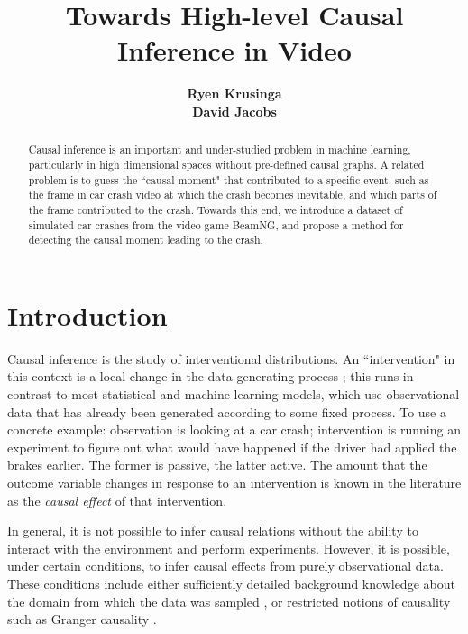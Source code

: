 \documentclass[letterpaper]{article} %
\title{Towards High-level Causal Inference in Video}
\author{
\Large \textbf{Ryen Krusinga} \\
\Large \textbf{David Jacobs}
}
\begin{document}
\maketitle

\begin{abstract}
Causal inference is an important and under-studied problem in machine learning, particularly in high dimensional spaces without pre-defined causal graphs. A related problem is to guess the ``causal moment" that contributed to a specific event, such as the frame in car crash video at which the crash becomes inevitable, and which parts of the frame contributed to the crash. Towards this end, we introduce a dataset of simulated car crashes from the video game BeamNG, and propose a method for detecting the causal moment leading to the crash.
\end{abstract}

\section{Introduction}
\noindent Causal inference is the study of interventional distributions. An ``intervention" in this context is a local change in the data generating process \cite{pearl2009causal}; this runs in contrast to most statistical and machine learning models, which use observational data that has already been generated according to some fixed process. To use a concrete example: observation is looking at a car crash; intervention is running an experiment to figure out what would have happened if the driver had applied the brakes earlier. The former is passive, the latter active. The amount that the outcome variable changes in response to an intervention is known in the literature as the \emph{causal effect} of that intervention.

In general, it is not possible to infer causal relations without the ability to interact with the environment and perform experiments. However, it is possible, under certain conditions, to infer causal effects from purely observational data. These conditions include either sufficiently detailed background knowledge about the domain from which the data was sampled \cite{pearl2009causal} \cite{rosenbaum1983central}, or restricted notions of causality such as Granger causality \cite{granger1969investigating} \cite{granger1980testing}.
\end{document}
